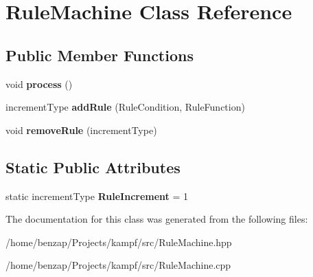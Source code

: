 \hypertarget{classRuleMachine}{\section{Rule\-Machine Class Reference}
\label{classRuleMachine}
}
\subsection*{Public Member Functions}
\begin{DoxyCompactItemize}
\item 
\hypertarget{classRuleMachine_ab9b8035ba79f01951fb66e363804da07}{void {\bfseries process} ()}\label{classRuleMachine_ab9b8035ba79f01951fb66e363804da07}

\item 
\hypertarget{classRuleMachine_a044d871aa5da795818d0cae794d69fe4}{increment\-Type {\bfseries add\-Rule} (Rule\-Condition, Rule\-Function)}\label{classRuleMachine_a044d871aa5da795818d0cae794d69fe4}

\item 
\hypertarget{classRuleMachine_ab4254b7defa4146e18138e948c713794}{void {\bfseries remove\-Rule} (increment\-Type)}\label{classRuleMachine_ab4254b7defa4146e18138e948c713794}

\end{DoxyCompactItemize}
\subsection*{Static Public Attributes}
\begin{DoxyCompactItemize}
\item 
\hypertarget{classRuleMachine_a983ddd65d47baa11faa02a8d60adbc9a}{static increment\-Type {\bfseries Rule\-Increment} = 1}\label{classRuleMachine_a983ddd65d47baa11faa02a8d60adbc9a}

\end{DoxyCompactItemize}


The documentation for this class was generated from the following files\-:\begin{DoxyCompactItemize}
\item 
/home/benzap/\-Projects/kampf/src/Rule\-Machine.\-hpp\item 
/home/benzap/\-Projects/kampf/src/Rule\-Machine.\-cpp\end{DoxyCompactItemize}
